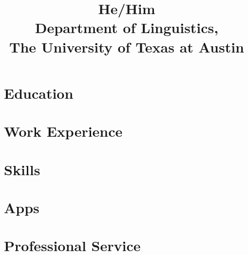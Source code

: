 \documentclass[11pt,a4paper]{mycv}
\title{He/Him\\Department of Linguistics,\\The University of Texas at Austin}
\begin{document}
\makecvtitle

\section{Education}


\section{Work Experience}


\begingroup
\setlength\bibitemsep{0.5ex}
\printbibliography[title=Select papers, nottype=unpublished]
\endgroup

\section{Skills}


\section{Apps}


\section{Professional Service}


% 
% 
% 
\end{document}
